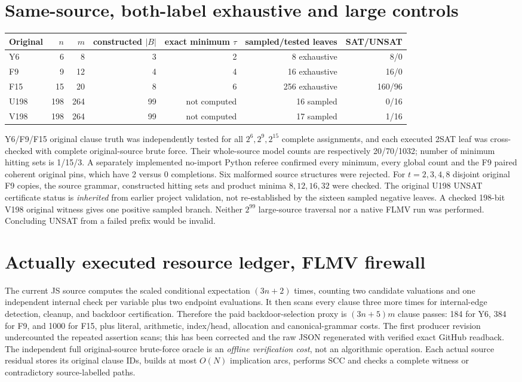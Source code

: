 \documentclass[11pt]{article}
\begin{document}
\section{Same-source, both-label exhaustive and large controls}
\begin{center}\small
\begin{tabular}{lrrrrrr}
\toprule
Original & $n$ & $m$ & constructed $|B|$ & exact minimum $\tau$ & sampled/tested leaves & SAT/UNSAT\\
\midrule
Y6 &6&8&3&2&8 exhaustive&8/0\\
F9 &9&12&4&4&16 exhaustive&16/0\\
F15 &15&20&8&6&256 exhaustive&160/96\\
U198 &198&264&99&not computed&16 sampled&0/16\\
V198 &198&264&99&not computed&17 sampled&1/16\\
\bottomrule
\end{tabular}
\end{center}
Y6/F9/F15 original clause truth was independently tested for all $2^6,2^9,2^{15}$ complete assignments, and each executed 2SAT leaf was cross-checked with complete original-source brute force. Their whole-source model counts are respectively 20/70/1032; number of minimum hitting sets is 1/15/3. A separately implemented no-import Python referee confirmed every minimum, every global count and the F9 paired coherent original pins, which have 2 versus 0 completions. Six malformed source structures were rejected. For $t=2,3,4,8$ disjoint original F9 copies, the source grammar, constructed hitting sets and product minima $8,12,16,32$ were checked. The original U198 UNSAT certificate status is \emph{inherited} from earlier project validation, not re-established by the sixteen sampled negative leaves. A checked 198-bit V198 original witness gives one positive sampled branch. Neither $2^{99}$ large-source traversal nor a native FLMV run was performed. Concluding UNSAT from a failed prefix would be invalid.

\section{Actually executed resource ledger, FLMV firewall}
The current JS source computes the scaled conditional expectation $(3n+2)$ times, counting two candidate valuations and one independent internal check per variable plus two endpoint evaluations. It then scans every clause three more times for internal-edge detection, cleanup, and backdoor certification. Therefore the paid backdoor-selection proxy is $(3n+5)m$ clause passes: 184 for Y6, 384 for F9, and 1000 for F15, plus literal, arithmetic, index/head, allocation and canonical-grammar costs. The first producer revision undercounted the repeated assertion scans; this has been corrected and the raw JSON regenerated with verified exact GitHub readback. The independent full original-source brute-force oracle is an \emph{offline verification cost}, not an algorithmic operation. Each actual source residual stores its original clause IDs, builds at most $O(N)$ implication arcs, performs SCC and checks a complete witness or contradictory source-labelled paths.
\end{document}
